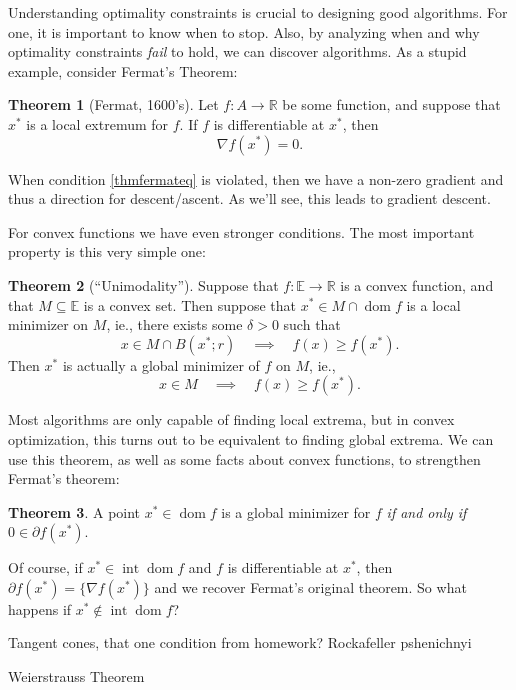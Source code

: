 \documentclass[11pt]{article}
\numberwithin{equation}{section}
\theoremstyle{definition}
\newtheorem{theorem}{Theorem}[section]
\newcommand{\bE}{\mathbb{E}}
\newcommand{\bR}{\mathbb{R}}
\newcommand{\sint}{\operatorname{int}}
\newcommand{\dom}{\operatorname{dom}}
\begin{document}
Understanding optimality constraints is crucial to designing good algorithms. For one, it is important to know when to stop. Also, by analyzing when and why optimality constraints \textit{fail} to hold, we can discover algorithms. As a stupid example, consider Fermat's Theorem:
\begin{theorem}[Fermat, 1600's]
    Let $f:A\to\bR$ be some function, and suppose that $x^*$ is a local extremum for $f$. If $f$ is differentiable at $x^*$, then
    \begin{equation}\label{thmfermateq}\nabla f(x^*)=0.\end{equation}
\end{theorem}
When condition \ref{thmfermateq} is violated, then we have a non-zero gradient and thus a direction for descent/ascent. As we'll see, this leads to gradient descent.

For convex functions we have even stronger conditions. The most important property is this very simple one:
\begin{theorem}[``Unimodality'']
    Suppose that $f:\bE\to\bR$ is a convex function, and that $M\subseteq\bE$ is a convex set. Then suppose that $x^*\in M\cap\dom f$ is a local minimizer on $M$, ie., there exists some $\delta>0$ such that
    \begin{equation}
        x\in M\cap B(x^*;r)\quad\implies\quad f(x)\ge f(x^*).
    \end{equation}
    Then $x^*$ is actually a global minimizer of $f$ on $M$, ie.,
    \begin{equation}
        x\in M\quad\implies\quad f(x)\ge f(x^*).
    \end{equation}
\end{theorem}
Most algorithms are only capable of finding local extrema, but in convex optimization, this turns out to be equivalent to finding global extrema. We can use this theorem, as well as some facts about convex functions, to strengthen Fermat's theorem:
\begin{theorem}
    \label{thmfirstoptcondition}
    A point $x^*\in\dom f$ is a global minimizer for $f$ \textit{if and only if} $0\in\partial f(x^*)$.
\end{theorem}
Of course, if $x^*\in\sint\dom f$ and $f$ is differentiable at $x^*$, then $\partial f(x^*)=\{\nabla f(x^*)\}$ and we recover Fermat's original theorem. So what happens if $x^*\not\in\sint\dom f$?

Tangent cones, that one condition from homework? Rockafeller pshenichnyi

Weierstrauss Theorem    
\end{document}
